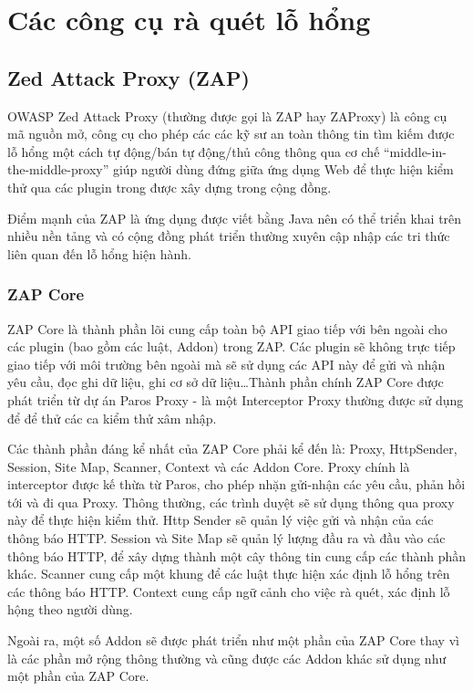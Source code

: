 \documentclass[./../main.tex]{subfiles}
\begin{document}
\section{Các công cụ rà quét lỗ hổng}

\subsection{Zed Attack Proxy (ZAP)}
OWASP Zed Attack Proxy (thường được gọi là  ZAP hay ZAProxy) là công cụ mã nguồn mở,
công cụ cho phép các các kỹ sư an toàn thông tin tìm kiếm được lỗ hổng một cách tự
động/bán tự động/thủ công thông qua cơ chế “middle-in-the-middle-proxy” giúp người
dùng đứng giữa ứng dụng Web để thực hiện kiểm thử qua các plugin trong được xây dựng
trong cộng đồng.

Điểm mạnh của ZAP là ứng dụng được viết bằng Java nên có thể triển khai trên
nhiều nền tảng và có cộng đồng phát triển thường xuyên cập nhập các tri thức
liên quan đến lỗ hổng hiện hành.

\subsubsection{ZAP Core}

ZAP Core là thành phần lõi cung cấp toàn bộ API giao tiếp với bên ngoài cho các
plugin (bao gồm các luật, Addon) trong ZAP. Các plugin sẽ không trực tiếp giao tiếp
với môi trường bên ngoài mà sẽ sử dụng các API này để  gửi và nhận yêu cầu, đọc ghi
dữ liệu, ghi cơ sở dữ liệu\ldots Thành phần chính ZAP Core được phát triển từ dự án
Paros Proxy - là một Interceptor Proxy thường được sử dụng để để thử các ca kiểm thử
xâm nhập.

Các thành phần đáng kể nhất của ZAP Core phải kể đến là: Proxy, HttpSender, Session,
Site Map, Scanner, Context và các Addon Core. Proxy chính là interceptor được kế thừa
từ Paros, cho phép nhặn gửi-nhận các yêu cầu, phản hồi tới và đi qua Proxy. Thông
thường, các trình duyệt sẽ sử dụng thông qua proxy này để thực hiện kiểm thử. Http
Sender sẽ quản lý việc gửi và nhận của các thông báo HTTP. Session và Site Map sẽ quản lý
lượng đầu ra và đầu vào các thông báo HTTP, để xây dựng thành một cây thông tin cung
cấp các thành phần khác. Scanner cung cấp một khung để các luật thực hiện xác định
lỗ hổng trên các thông báo HTTP. Context cung cấp ngữ cảnh cho việc rà quét, xác định
lỗ hộng theo người dùng.

Ngoài ra, một số Addon sẽ được phát triển như một phần của ZAP Core thay vì
là các phần mở rộng thông thường và cũng được các Addon khác sử dụng như
một phần của ZAP Core.
\end{document}
